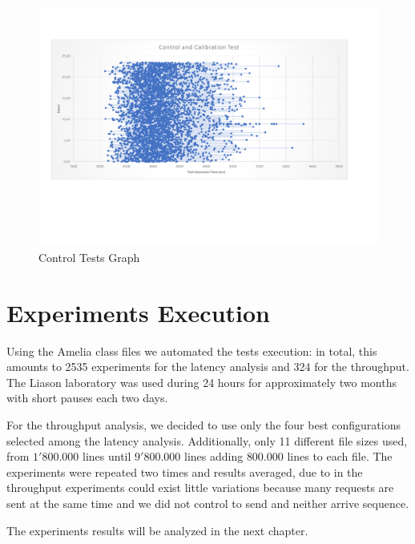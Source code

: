 \begin{landscape}
	\begin{figure}[p!]
		\centering
		\includegraphics[trim=1cm 5cm 5cm 1cm, scale=0.9]{fig/PruebaControl.pdf}
		\caption{Control Tests Graph}
		\label{fig:pruebaControl}
	\end{figure}
\end{landscape}

\section{Experiments Execution}
Using the Amelia class files we automated the tests execution: in total, this amounts to 2535 experiments for the latency analysis and 324 for the throughput. The Liason laboratory was used during 24 hours for approximately two months with short pauses each two days.

For the throughput analysis, we decided to use only the four best configurations selected among the latency analysis. Additionally, only 11 different file sizes used, from $1'800.000$ lines until $9'800.000$ lines adding $800.000$ lines to each file. The experiments were repeated two times and results averaged, due to in the throughput experiments could exist little variations because many requests are sent at the same time and we did not control to send and neither arrive sequence.

The experiments results will be analyzed in the next chapter.


